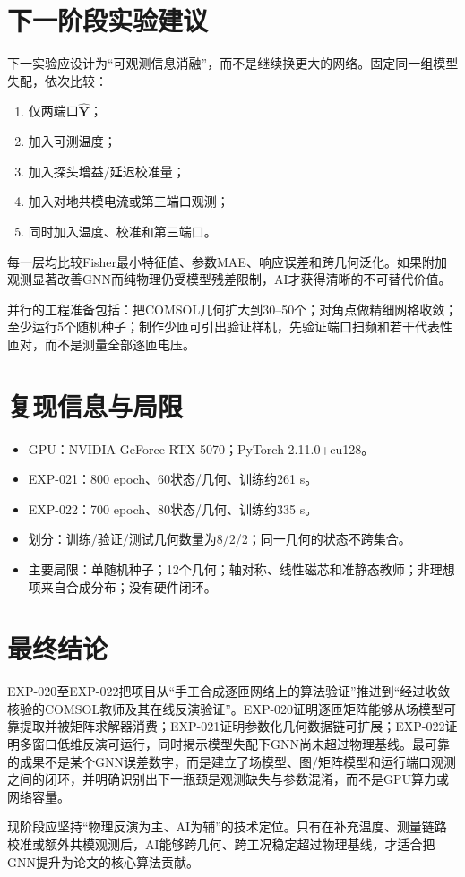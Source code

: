 \documentclass[11pt,a4paper]{ctexart}
\newcommand{\vect}[1]{\bm{#1}}
\begin{document}
\section{下一阶段实验建议}
下一实验应设计为“可观测信息消融”，而不是继续换更大的网络。固定同一组模型失配，依次比较：
\begin{enumerate}
\item 仅两端口$\widehat{\vect Y}$；
\item 加入可测温度；
\item 加入探头增益/延迟校准量；
\item 加入对地共模电流或第三端口观测；
\item 同时加入温度、校准和第三端口。
\end{enumerate}
每一层均比较Fisher最小特征值、参数MAE、响应误差和跨几何泛化。如果附加观测显著改善GNN而纯物理仍受模型残差限制，AI才获得清晰的不可替代价值。

并行的工程准备包括：把COMSOL几何扩大到30--50个；对角点做精细网格收敛；至少运行5个随机种子；制作少匝可引出验证样机，先验证端口扫频和若干代表性匝对，而不是测量全部逐匝电压。

\section{复现信息与局限}
\begin{itemize}
\item GPU：NVIDIA GeForce RTX 5070；PyTorch 2.11.0+cu128。
\item EXP-021：800 epoch、60状态/几何、训练约261 s。
\item EXP-022：700 epoch、80状态/几何、训练约335 s。
\item 划分：训练/验证/测试几何数量为8/2/2；同一几何的状态不跨集合。
\item 主要局限：单随机种子；12个几何；轴对称、线性磁芯和准静态教师；非理想项来自合成分布；没有硬件闭环。
\end{itemize}

\section{最终结论}
EXP-020至EXP-022把项目从“手工合成逐匝网络上的算法验证”推进到“经过收敛核验的COMSOL教师及其在线反演验证”。EXP-020证明逐匝矩阵能够从场模型可靠提取并被矩阵求解器消费；EXP-021证明参数化几何数据链可扩展；EXP-022证明多窗口低维反演可运行，同时揭示模型失配下GNN尚未超过物理基线。最可靠的成果不是某个GNN误差数字，而是建立了场模型、图/矩阵模型和运行端口观测之间的闭环，并明确识别出下一瓶颈是观测缺失与参数混淆，而不是GPU算力或网络容量。

现阶段应坚持“物理反演为主、AI为辅”的技术定位。只有在补充温度、测量链路校准或额外共模观测后，AI能够跨几何、跨工况稳定超过物理基线，才适合把GNN提升为论文的核心算法贡献。
\end{document}
